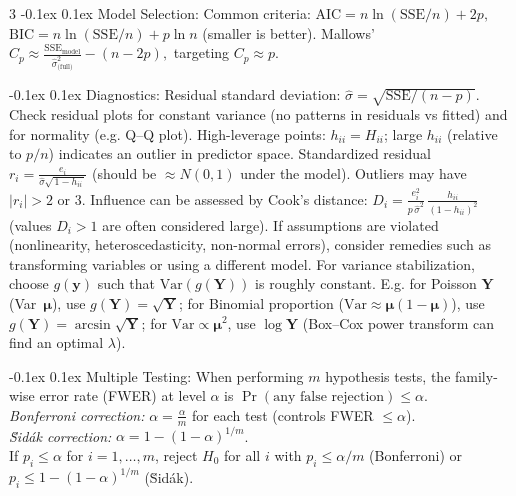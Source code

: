 \documentclass[10pt]{article}
\makeatletter
\renewcommand{\section}{\@startsection{section}{1}{0mm}
  {-0.1ex}%
  {0.1ex}%
  {\normalfont\normalsize\bfseries\color{thm-color}}}
\newcommand{\vect}[1]{\symbf{#1}} %
\makeatother
\begin{document}
\begin{multicols}{3}
  \section{Model Selection:}
  Common criteria: \( \text{AIC} = n\ln(\mathrm{SSE}/n) + 2p, \) \quad
  \( \text{BIC} = n\ln(\mathrm{SSE}/n) + p\ln n \) \quad (smaller is better).
  Mallows' \( C_p \approx \frac{\mathrm{SSE}_{\text{model}}}{\hat{\sigma}^2_{\text{(full)}}} - (n - 2p), \) targeting \( C_p \approx p. \)

  \section{Diagnostics:}
  Residual standard deviation: \( \hat{\sigma} = \sqrt{\mathrm{SSE}/(n-p)}. \)
  Check residual plots for constant variance (no patterns in residuals vs fitted) and for normality (e.g. Q--Q plot).
  High-leverage points: \( h_{ii} = H_{ii} \); large \( h_{ii} \) (relative to \( p/n \)) indicates an outlier in predictor space.
  Standardized residual \( r_i = \frac{e_i}{\hat{\sigma}\sqrt{\,1-h_{ii}\,}} \) (should be \( \approx N(0,1) \) under the model).
  Outliers may have \( |r_i| > 2 \) or \( 3 \).
  Influence can be assessed by Cook's distance: \( D_i = \frac{e_i^2}{p\,\hat{\sigma}^2}\,\frac{h_{ii}}{(1-h_{ii})^2} \) (values \( D_i > 1 \) are often considered large).
  If assumptions are violated (nonlinearity, heteroscedasticity, non-normal errors), consider remedies such as transforming variables or using a different model.
  For variance stabilization, choose \( g(\vect{y}) \) such that \( \mathrm{Var}(g(\vect{Y})) \) is roughly constant.
  E.g. for Poisson \( \vect{Y} \) (Var~\( \vect{\mu} \)), use \( g(\vect{Y})=\sqrt{\vect{Y}} \); for Binomial proportion (\( \mathrm{Var}\approx \vect{\mu}(1-\vect{\mu}) \)), use \( g(\vect{Y})=\arcsin\sqrt{\vect{Y}} \); for \( \mathrm{Var}\propto \vect{\mu}^2 \), use \( \log \vect{Y} \) (Box–Cox power transform can find an optimal \( \lambda \)).

  \section{Multiple Testing:}
  When performing \( m \) hypothesis tests, the family-wise error rate (FWER) at level \( \alpha \) is \( \Pr(\text{any false rejection})\le \alpha. \)\\[0em]
  \textit{Bonferroni correction:} \( \alpha = \frac{\alpha}{m} \) for each test (controls FWER \( \le \alpha \)).\\[0em]
  \textit{S̆idák correction:} \( \alpha = 1 - (1-\alpha)^{1/m} \).\\[0em]
  If \(p_i \le \alpha\) for \(i=1,\dots,m\), reject \(H_0\) for all \(i\) with \(p_i \le \alpha/m\) (Bonferroni) or \(p_i \le 1-(1-\alpha)^{1/m}\) (S̆idák).\\[0em]


\end{multicols}
\end{document}
